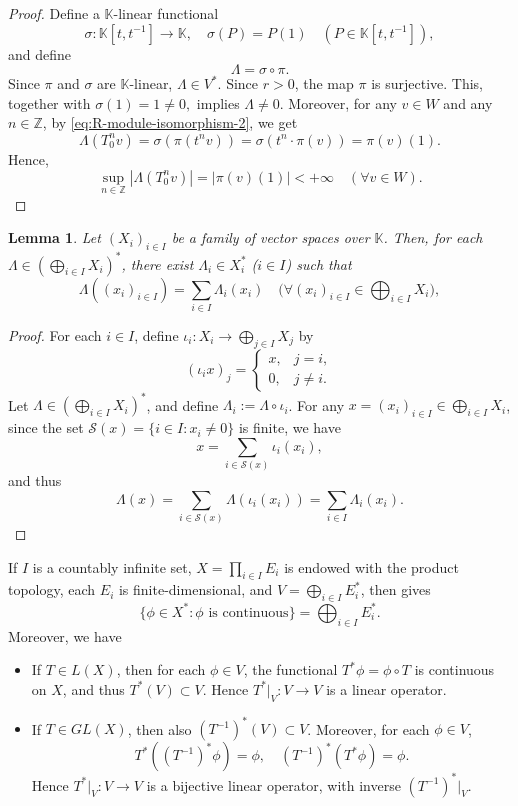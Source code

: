 \documentclass[11pt]{amsart}
\newtheorem{lemma}{Lemma}
\theoremstyle{definition}
\theoremstyle{remark}
\theoremstyle{plain}
\begin{document}
\begin{proof}
Define a \(\mathbb{K}\)-linear functional
\[
\sigma:\mathbb{K}[t,t^{-1}]\to\mathbb{K},
\quad
\sigma(P)=P(1)
\quad(P\in\mathbb{K}[t,t^{-1}]),
\]
and define
\[
\Lambda=\sigma\circ\pi.
\]
Since \(\pi\) and \(\sigma\) are \(\mathbb{K}\)-linear, \(\Lambda\in V^*\).
Since \(r>0\), the map \(\pi\) is surjective.
This, together with \(\sigma(1)=1\ne0,\)
implies \(\Lambda\ne0.\)
Moreover, for any
\(v\in W\) and any \(n\in\mathbb{Z}\),
by \eqref{eq:R-module-isomorphism-2}, we get
\[
\Lambda(T_0^nv)=
\sigma(\pi(t^n v))
=\sigma(t^n\cdot \pi(v))
=\pi(v)(1).
\]
Hence,
\[
\sup_{n\in\mathbb{Z}}
|\Lambda(T_0^nv)|
= |\pi(v)(1)| <
+\infty \quad (\forall v\in W).
\]
\end{proof}

\begin{lemma}
\label{lem:dual-of-algebraic-direct-sum}
Let \((X_i)_{i\in I}\) be a family of vector spaces over \(\mathbb K\).
Then, for each
\(\Lambda\in(\bigoplus_{i\in I}X_i)^*\), there exist
\(\Lambda_i\in X_i^*\) (\(i\in I\)) such that
\[
\Lambda((x_i)_{i\in I})
=
\sum_{i\in I}\Lambda_i(x_i)
\quad
\big(\forall (x_i)_{i\in I}\in\bigoplus_{i\in I}X_i\big),
\]
\end{lemma}

\begin{proof}
For each \(i\in I\), define
\(\iota_i:X_i\to\bigoplus_{j\in I}X_j\) by
\[
(\iota_i x)_j=
\begin{cases}
x, & j=i,\\
0, & j\ne i.
\end{cases}
\]
Let \(\Lambda\in(\bigoplus_{i\in I}X_i)^*\), and define
\(\Lambda_i:=\Lambda\circ\iota_i\). For any
\(x=(x_i)_{i\in I}\in\bigoplus_{i\in I}X_i\), since
the set \(\mathscr{S}(x)=\{i\in I:x_i\ne0\}\) is finite,
we have
\[
x=\sum_{i\in \mathscr{S}(x)}\iota_i(x_i),
\]
and thus
\[
\Lambda(x)=\sum_{i\in \mathscr{S}(x)}\Lambda(\iota_i(x_i))
=\sum_{i\in I}\Lambda_i(x_i).
\]
\end{proof}

If \(I\) is a countably infinite set, \(X=\prod_{i\in I}E_i\) is endowed
with the product topology, each \(E_i\) is finite-dimensional, and
\(V=\bigoplus_{i\in I}E_i^*\), then
\cite[Chapter~IV, $\S$~4, Theorem~4.3]{SchaeferWolff} gives
\[
\{\phi\in X^*:\phi\text{ is continuous}\}
=
\bigoplus_{i\in I}E_i^*.
\]
Moreover, we have
\begin{itemize}
  \item If \(T\in L(X)\), then for each \(\phi\in V\), the functional
\(T^*\phi=\phi\circ T\) is continuous on \(X\), and thus
\(T^*(V)\subset V\). Hence \(T^*|_V:V\to V\) is a linear operator.
  \item If \(T\in GL(X)\), then also \((T^{-1})^*(V)\subset V\).
  Moreover, for each
\(\phi\in V\),
\[
T^*((T^{-1})^*\phi)=\phi,\quad
(T^{-1})^*(T^*\phi)=\phi.
\]
Hence \(T^*|_V:V\to V\) is a bijective
linear operator, with inverse \((T^{-1})^*|_V\).
\end{itemize}
\end{document}
